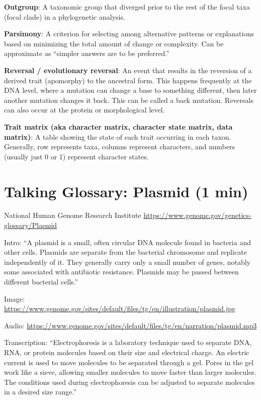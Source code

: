 \documentclass[
]{book}
\begin{document}
\textbf{Outgroup}: A taxonomic group that diverged prior to the rest of the focal taxa (focal clade) in a phylogenetic analysis.

\textbf{Parsimony}: A criterion for selecting among alternative patterns or explanations based on minimizing the total amount of change or complexity. Can be approximate as ``simpler answers are to be preferred.''

\textbf{Reversal / evolutionary reversal}: An event that results in the reversion of a derived trait (apomorphy) to the ancestral form. This happens frequently at the DNA level, where a mutation can change a base to something different, then later another mutation changes it back. This can be called a back mutation. Reversals can also occur at the protein or morphological level.

\textbf{Trait matrix (aka character matrix, character state matrix, data matrix)}: A table showing the state of each trait occurring in each taxon. Generally, row represents taxa, columns represent characters, and numbers (usually just 0 or 1) represent character states.

\hypertarget{talking-glossary-plasmid-1-min}{%
\section{Talking Glossary: Plasmid (1 min)}\label{talking-glossary-plasmid-1-min}}

National Human Genome Research Institute
\url{https://www.genome.gov/genetics-glossary/Plasmid}

Intro: ``A plasmid is a small, often circular DNA molecule found in bacteria and other cells. Plasmids are separate from the bacterial chromosome and replicate independently of it. They generally carry only a small number of genes, notably some associated with antibiotic resistance. Plasmids may be passed between different bacterial cells.''

Image: \url{https://www.genome.gov/sites/default/files/tg/en/illustration/plasmid.jpg}

Audio: \url{https://www.genome.gov/sites/default/files/tg/en/narration/plasmid.mp3}

Transcription:
``Electrophoresis is a laboratory technique used to separate DNA, RNA, or protein molecules based on their size and electrical charge. An electric current is used to move molecules to be separated through a gel. Pores in the gel work like a sieve, allowing smaller molecules to move faster than larger molecules. The conditions used during electrophoresis can be adjusted to separate molecules in a desired size range.''
\end{document}
